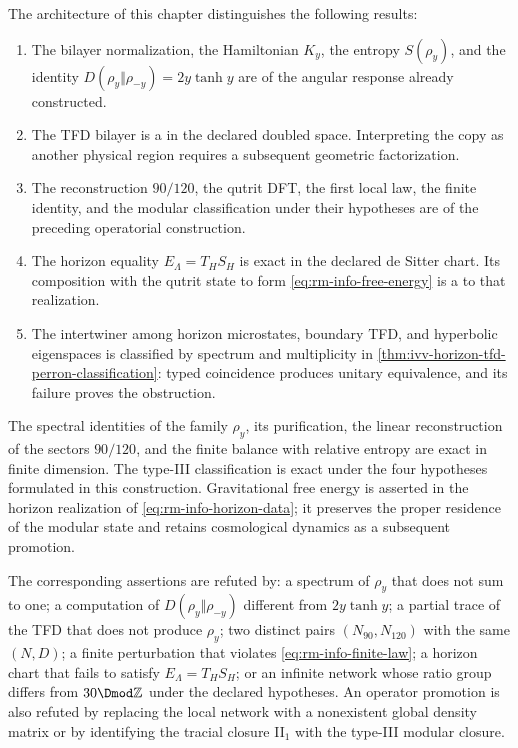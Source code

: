 The architecture of this chapter distinguishes the following
results:
\begin{enumerate}[label=\textup{(\roman*)}]
 \item The bilayer normalization, the Hamiltonian
 \(K_y\), the entropy
 \(S(\rho_y)\), and the identity
 \(D(\rho_y\Vert\rho_{-y})=2y\tanh y\) are
  of the angular response already
 constructed.
 \item The TFD bilayer is a  in the
 declared doubled space. Interpreting the copy as another
 physical region requires a subsequent geometric factorization.
 \item The reconstruction \(90/120\), the qutrit DFT,
the first local law, the finite identity, and the modular
classification under their hypotheses are
  of the preceding operatorial construction.
 \item The horizon equality
 \(E_\Lambda=T_HS_H\) is exact in the declared de Sitter chart. Its
 composition with the qutrit state to form
 \cref{eq:rm-info-free-energy} is a
  to that realization.
 \item The intertwiner among horizon microstates, boundary TFD, and
 hyperbolic eigenspaces is classified by spectrum and multiplicity
 in \cref{thm:ivv-horizon-tfd-perron-classification}: typed coincidence
 produces unitary equivalence, and its failure proves the obstruction.
\end{enumerate}

\begin{proofstatusbox}
The spectral identities of the family \(\rho_y\), its purification,
the linear reconstruction of the sectors \(90/120\), and the finite balance
with relative entropy are exact in finite dimension. The type-III classification
is exact under the four hypotheses formulated in this construction.
Gravitational free energy is asserted in the horizon realization of
\cref{eq:rm-info-horizon-data}; it preserves the proper residence of the
modular state and retains cosmological dynamics as a subsequent promotion.
\end{proofstatusbox}

\begin{falsifierbox}
The corresponding assertions are refuted by: a spectrum of \(\rho_y\) that does not
sum to one; a computation of
\(D(\rho_y\Vert\rho_{-y})\) different from \(2y\tanh y\); a partial trace of
the TFD that does not produce \(\rho_y\); two distinct pairs
\((N_{90},N_{120})\) with the same \((N,D)\); a finite perturbation
that violates \cref{eq:rm-info-finite-law}; a horizon chart that fails to satisfy
\(E_\Lambda=T_HS_H\); or an infinite network whose ratio group differs from
\(30\Dmod\mathbb Z\) under the declared hypotheses. An operator
promotion is also refuted by replacing the local network with a nonexistent global
density matrix or by identifying the tracial closure II\(_1\) with the
type-III modular closure.
\end{falsifierbox}
